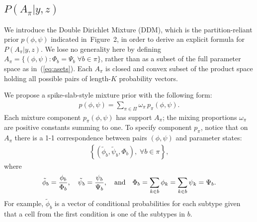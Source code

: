 \documentclass[aoas,preprint]{imsart}
\begin{document}
\subsection{$P(A_\pi|y,z)$}



We introduce the Double Dirichlet Mixture (DDM), 
which is the partition-reliant prior $p(\phi,\psi)$ indicated in~Figure~2, 
in order to derive an explicit
formula for $P(A_\pi|y,z)$.   We lose no generality here by defining
$A_\pi = \{ (\phi,\psi): \Phi_b = \Psi_b \;  \forall b \in \pi \}$, rather than as a subset of the full
parameter space as in~(\ref{eq:asets}).   Each $A_\pi$ is closed and convex subset of the product space
holding all possible pairs of length-$K$ probability vectors.

We propose a spike-slab-style mixture prior with the following form:
\begin{eqnarray}
\label{eq:ddmix}
p(\phi,\psi) = \sum_{\pi \in \Pi} \omega_\pi  \, p_\pi(\phi,\psi ).
\end{eqnarray} 
Each mixture component $p_\pi(\phi,\psi)$ has support $A_\pi$;  
the mixing proportions $\omega_\pi$ are positive constants summing to one. 
To specify component $p_\pi$,  notice that on $A_\pi$ there is a 1-1 correspondence between pairs $(\phi, \psi)$ and 
parameter states:
\begin{eqnarray}
\label{eq:onetoone}
 \left\{ (\tilde \phi_b, \tilde \psi_b, \Phi_b), \; \forall b \in \pi \right\}, 
\end{eqnarray}
where
\begin{eqnarray*}
\tilde{\phi}_b = \frac{\phi_b}{\Phi_b}, \quad \tilde{\psi}_b = \frac{\psi_b}{\Psi_b}, \quad 
{\mbox {\rm and}} \quad \Phi_b = \sum_{k \in b} \phi_k = \sum_{k \in b} \psi_k = \Psi_b.
\end{eqnarray*}
For example, $\tilde{\phi}_b$ is a vector of conditional probabilities for each subtype given that a cell
from the first condition is one of the subtypes in $b$. 
\end{document}
